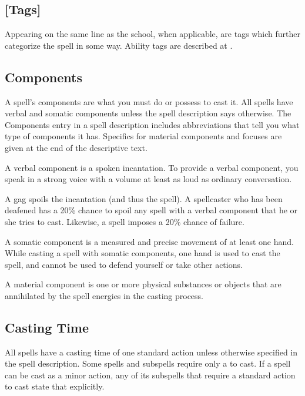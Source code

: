     \subsection{[Tags]}
        Appearing on the same line as the school, when applicable, are tags which further categorize the spell in some way.
        Ability tags are described at .

    \subsection{Components}\label{Components}
        A spell's components are what you must do or possess to cast it.
        All spells have verbal and somatic components unless the spell description says otherwise.
        The Components entry in a spell description includes abbreviations that tell you what type of components it has.
        Specifics for material components and focuses are given at the end of the descriptive text.

         A verbal component is a spoken incantation.
        To provide a verbal component, you speak in a strong voice with a volume at least as loud as ordinary conversation.

        A gag spoils the incantation (and thus the spell). A spellcaster who has been deafened has a 20\% chance to spoil any spell with a verbal component that he or she tries to cast.
        Likewise, a  spell imposes a 20\% chance of failure.

         A somatic component is a measured and precise movement of at least one hand.
        While casting a spell with somatic components, one hand is used to cast the spell, and cannot be used to defend yourself or take other actions.

         A material component is one or more physical substances or objects that are annihilated by the spell energies in the casting process.

    \subsection{Casting Time}
        All spells have a casting time of one standard action unless otherwise specified in the spell description.
        Some spells and subspells require only a  to cast.
        If a spell can be cast as a minor action, any of its subspells that require a standard action to cast state that explicitly.

